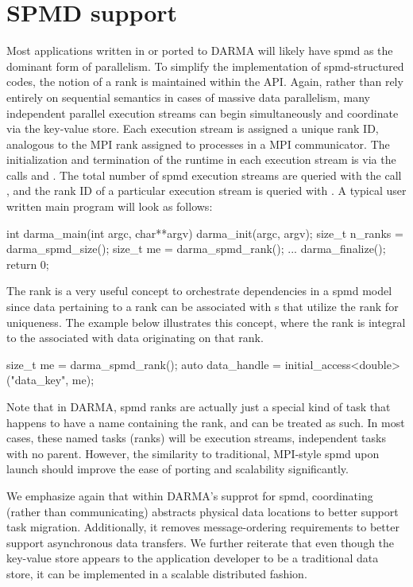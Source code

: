 
\section{SPMD support}
\label{sec:spmd}
Most applications written in or ported to \gls{DARMA} will likely have \gls{spmd} as
the dominant form of parallelism.
To simplify the implementation of \gls{spmd}-structured codes, the notion of 
a \gls{rank} is maintained within the \gls{API}.   
Again, rather than rely entirely on \gls{sequential semantics} in cases of massive data parallelism,
many independent parallel \glspl{execution stream} can begin simultaneously and
coordinate via the \gls{key-value store}.
Each \gls{execution stream} is assigned a unique \gls{rank} ID, analogous to the MPI rank assigned to processes in a MPI communicator.
The initialization and termination of the runtime in each \gls{execution stream} is via the calls  
and . 
The total number of \gls{spmd} \glspl{execution stream} are queried with the call ,
and the \gls{rank} ID of a particular \gls{execution stream} is queried with
    . A typical user written main program will look as follows:
\begin{CppCode}
int darma_main(int argc, char**argv){
  darma_init(argc, argv);
  size_t n_ranks = darma_spmd_size();
  size_t me = darma_spmd_rank();
  ...
  darma_finalize();
  return 0;
}
\end{CppCode}

The \gls{rank} is a very useful concept to orchestrate dependencies in a \gls{spmd}
model since data pertaining to a \gls{rank} can be associated with s that utilize
the \gls{rank} for uniqueness. The example below illustrates this concept, where
the \gls{rank} is integral to the  associated with data
originating on that \gls{rank}.
\begin{CppCode}
size_t me = darma_spmd_rank();
auto data_handle = initial_access<double>("data_key", me);
\end{CppCode}  
Note that in \gls{DARMA}, \gls{spmd} \glspl{rank} are actually just a special
kind of \gls{task} that happens to have a name containing the \gls{rank}, and can be treated as such. 
In most cases, these named tasks (ranks) will be \glspl{execution stream}, independent tasks with no parent.
However, the similarity to traditional, MPI-style \gls{spmd} upon launch should improve the ease of porting and scalability significantly.

We emphasize again that within \gls{DARMA}'s supprot for \gls{spmd}, 
coordinating (rather than communicating) abstracts physical data locations to better support task migration.
Additionally, it removes message-ordering requirements to better support asynchronous data transfers.
We further reiterate that even though the \gls{key-value store} appears to the
application developer to be a traditional data store, it can be implemented in a scalable distributed fashion.

